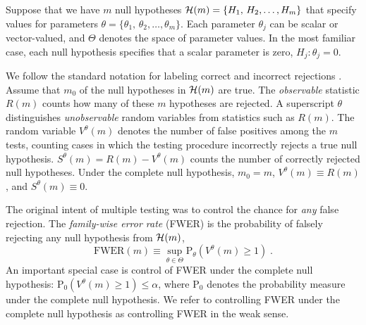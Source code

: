\documentclass[12pt]{article}
\newcommand{\pr}{\mbox{P}}
\begin{document}
Suppose that we have  $m$ null hypotheses ${\cal H}(m) =
\{H_1, \, H_2, \ldots, H_m\}$ that specify values for parameters
$\theta = \{\theta_1,\,\theta_2, \ldots, \theta_m \}$.  Each parameter
$\theta_j$ can be scalar or vector-valued, and $\Theta$ denotes the
space of parameter values.  In the most familiar case, each null
hypothesis specifies that a scalar parameter is zero, $H_j: \theta_j =
0$. 


We follow the standard notation for labeling correct and incorrect
rejections \citep{benjamini95}.  Assume that $m_0$ of the null
hypotheses in ${\cal H}(m)$ are true.  The {\em observable} statistic
$R(m)$ counts how many of these $m$ hypotheses are rejected.   A 
superscript $\theta$ distinguishes {\em unobservable} random variables from 
statistics such as $R(m)$.  The random variable 
$V^\theta(m)$ denotes the number of
false positives among the $m$ tests, counting cases in which the testing
procedure incorrectly rejects a true null hypothesis.  
$S^{\theta}(m) = R(m)-V^\theta(m)$ counts the number of correctly
rejected null hypotheses. Under the complete null hypothesis, 
$m_0 = m$, $V^\theta(m) \equiv R(m)$, and $S^{\theta}(m) \equiv 0$.


The original intent of multiple testing was to control the chance for {\em
any} false rejection.  The {\em family-wise error rate} (FWER) is the
probability of falsely rejecting any null hypothesis from ${\cal
H}(m)$,
\begin{equation}
  \mbox{FWER}(m) \equiv 
   \sup_{\theta \in \Theta} \pr_\theta(V^\theta(m) \ge 1) \;.
\label{eq:fwer}
\end{equation}
An important special case is control of FWER under the complete null
 hypothesis:
$ \pr_0(V^\theta(m) \ge 1) \le \alpha$,
where $\pr_0$ denotes the probability measure under the complete null
 hypothesis.  We refer to  controlling FWER under the complete null hypothesis
 as controlling FWER in the weak sense.
\end{document}

